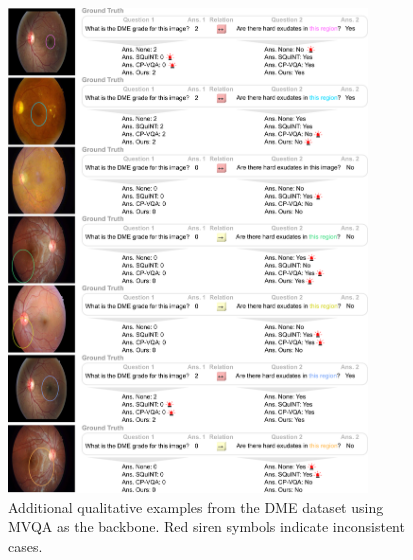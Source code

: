 \begin{figure}[!t]
\centering
\includegraphics[width=0.85\textwidth]{Figures/Part2_Consist/02_logic/examples_dme_supplementary2.pdf}
\caption{Additional qualitative examples from the DME dataset using MVQA as the backbone. Red siren symbols indicate inconsistent cases.}
\label{fig:examples_introspect6}
\end{figure}